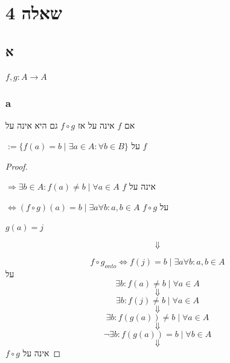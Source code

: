 \documentclass{article}
\begin{document}
\square

\newpage


\section*{שאלה 4}

\subsection*{א}

\begin{letyehi}
    $ f, g : A \rightarrow A $
\end{letyehi}

\subsubsection*{a}

\begin{ntp}
    אם $f$ אינה על אז $ f \circ g $ גם היא אינה על
\end{ntp}

\begin{define}
    $ := \{ f(a) = b \; | \; \exists a \in A : \forall b \in B \} $
    על $f$
\end{define}

\begin{proof}
    \begin{remark}
        $ \Rightarrow \exists b \in A : f(a) \not = b \; | \; \forall a \in A $
        $f$ אינה על
    \end{remark}

    $ \iff (f \circ g)(a) = b \; | \; \exists a \forall b : a, b \in A $
    $ f \circ g $ על

\begin{letyehi}
    $ g(a) = j $
\end{letyehi}

\[\Downarrow\]

\[
    f \circ g _{onto} \iff f(j) = b \; | \; \exists a \forall b : a, b \in A
\] על
\[
    \exists b : f(a) \not = b \; | \; \forall a \in A
\]
\[\Downarrow\]
\[
    \exists b : f(j) \not = b \; | \; \forall a \in A
\]
\[\Downarrow\]
\[
    \exists b : f(g(a)) \not = b \; | \; \forall a \in A
\]
\[\Downarrow\]
\[
    \boxed{\lnot \exists b : f(g(a)) = b \; | \; \forall b \in A}
\]
\[\Downarrow\]
$ f \circ g $ אינה על
\square

\end{proof}

\newpage
\end{document}
